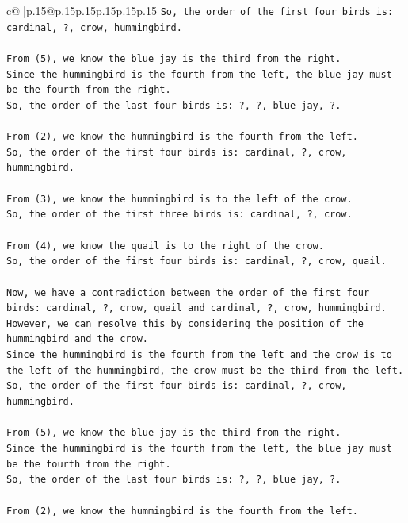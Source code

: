 \documentclass{article}
\begin{document}
{\begin{supertabular}{c@{$\;$}|p{.15\linewidth}@{}p{.15\linewidth}p{.15\linewidth}p{.15\linewidth}p{.15\linewidth}p{.15\linewidth}}
{{{\texttt{So, the order of the first four birds is: cardinal, ?, crow, hummingbird.} \\
\\ 
\texttt{From (5), we know the blue jay is the third from the right. } \\
\texttt{Since the hummingbird is the fourth from the left, the blue jay must be the fourth from the right. } \\
\texttt{So, the order of the last four birds is: ?, ?, blue jay, ?.} \\
\\ 
\texttt{From (2), we know the hummingbird is the fourth from the left. } \\
\texttt{So, the order of the first four birds is: cardinal, ?, crow, hummingbird.} \\
\\ 
\texttt{From (3), we know the hummingbird is to the left of the crow. } \\
\texttt{So, the order of the first three birds is: cardinal, ?, crow.} \\
\\ 
\texttt{From (4), we know the quail is to the right of the crow. } \\
\texttt{So, the order of the first four birds is: cardinal, ?, crow, quail.} \\
\\ 
\texttt{Now, we have a contradiction between the order of the first four birds: cardinal, ?, crow, quail and cardinal, ?, crow, hummingbird. } \\
\texttt{However, we can resolve this by considering the position of the hummingbird and the crow. } \\
\texttt{Since the hummingbird is the fourth from the left and the crow is to the left of the hummingbird, the crow must be the third from the left. } \\
\texttt{So, the order of the first four birds is: cardinal, ?, crow, hummingbird.} \\
\\ 
\texttt{From (5), we know the blue jay is the third from the right. } \\
\texttt{Since the hummingbird is the fourth from the left, the blue jay must be the fourth from the right. } \\
\texttt{So, the order of the last four birds is: ?, ?, blue jay, ?.} \\
\\ 
\texttt{From (2), we know the hummingbird is the fourth from the left. } \\
}}}
\end{supertabular}}
\end{document}
